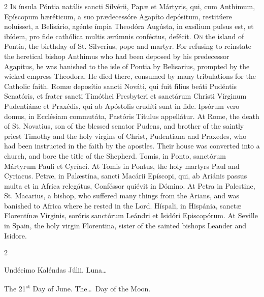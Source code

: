 \begin{paracol}{2}
\lettrine[lines=2]{I}{n} ínsula Póntia 
 natális sancti Silvérii, Papæ et Mártyris, qui, cum Anthimum, Epíscopum hæréticum, a suo prædecessóre Agapíto depósitum, restitúere noluísset, a 
 Belisário, agénte ímpia Theodóra Augústa, in exsílium pulsus est, et ibídem, 
 pro fide cathólica multis ærúmnis conféctus, defécit.
\switchcolumn
{}
\lettrine[lines=2]{O}{n} the island of Pontia, the 
 birthday of St. Silverius, pope and martyr. For refusing to reinstate 
 the heretical bishop Anthimus who had been deposed by his predecessor 
 Agapitus, he was banished to the isle of Pontia by Belisarius, prompted by 
 the wicked empress Theodora. He died there, consumed by many 
 tribulations for the Catholic faith.
\switchcolumn*
{}
Romæ deposítio sancti 
 Nováti, qui fuit fílius beáti Pudéntis Senatóris, et frater sancti Timóthei 
 Presbyteri et sanctárum Christi Vírginum Pudentiánæ et Praxédis, qui ab 
 Apóstolis erudíti sunt in fide. Ipsórum vero domus, in Ecclésiam 
 commutáta, Pastóris Títulus appellátur.
\switchcolumn
{}
At Rome, the death of St. Novatius, 
 son of the blessed senator Pudens, and brother of the saintly priest Timothy 
 and the holy virgins of Christ, Pudentiana and Praxedes, who had been 
 instructed in the faith by the apostles. Their house was converted 
 into a church, and bore the title of the Shepherd.
\switchcolumn*
{}
Tomis, in Ponto, 
 sanctórum Mártyrum Pauli et Cyríaci.
\switchcolumn
{}
At Tomis in Pontus, the holy martyrs 
 Paul and Cyriacus.
\switchcolumn*
{}
Petræ, in Palæstína, 
 sancti Macárii Epíscopi, qui, ab Ariánis passus multa et in Africa relegátus, 
 Conféssor quiévit in Dómino.
\switchcolumn
{}
At Petra in Palestine, St. Macarius, 
 a bishop, who suffered many things from the Arians, and was banished to 
 Africa where he rested in the Lord.
\switchcolumn*
{}
Híspali, in Hispánia, 
 sanctæ Florentínæ Vírginis, soróris sanctórum Leándri et Isidóri Episcopórum.
\switchcolumn
{}
At Seville in Spain, the holy virgin 
 Florentina, sister of the sainted bishops Leander and Isidore.
\switchcolumn*
{}
\end{paracol}


\begin{paracol}{2}
\begin{center}{\color{gregoriocolor} Undécimo Kaléndas Júlii. 
 Luna\dots\ }\end{center}
\switchcolumn
{}
\begin{center}{\color{gregoriocolor} The 
 21\textsuperscript{st} Day of 
 June. The\dots\ Day of the Moon.}\end{center}
\end{paracol}

